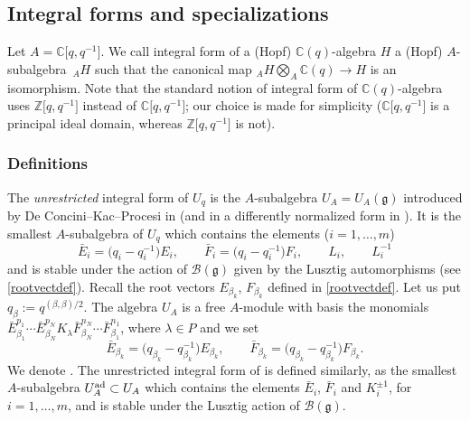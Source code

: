 \documentclass[10pt,a4paper]{amsart}
\numberwithin{equation}{section}
\theoremstyle{definition}
\newcommand{\mc}{\mathbb{C}}
\newcommand{\mz}{\mathbb{Z}}
\newcommand{\ra}{\rightarrow}
\begin{document}
\subsection{Integral forms and specializations}\label{INTEG} Let $A=\mc\big[q,q^{-1}\big]$. We call integral form of a (Hopf) $\mc(q)$-algebra $H$ a (Hopf) $A$-subalgebra~${}_AH$ such that the canonical map ${}_AH\bigotimes_A \mc(q) \ra H$ is an isomorphism. Note that the standard notion of integral form of $\mc(q)$-algebra uses $\mz\big[q,q^{-1}\big]$ instead of $\mc\big[q,q^{-1}\big]$; our choice is made for simplicity ($\mc\big[q,q^{-1}\big]$ is a principal ideal domain, whereas $\mz\big[q,q^{-1}\big]$ is not).

\subsubsection{Definitions}\label{defintform} The {\it unrestricted} integral form of $U_q$ is the $A$-subalgebra $U_A = U_A(\mathfrak{g})$ introduced by De Concini--Kac--Procesi in \cite[Section 12]{DC-K-P2} (and in a differently normalized form in \cite{DC-K,DC-K-P1}). It is the smallest $A$-subalgebra of $U_q$ which contains the elements ($i=1,\dots,m$)
\begin{equation}\label{normgen0}
\bar{E}_i = \big(q_i-q_i^{-1}\big)E_i,\qquad \bar{F}_i = \big(q_i-q_i^{-1}\big)F_i,\qquad L_i,\qquad L_i^{-1}
\end{equation}
and is stable under the action of $\mathcal{B}(\mathfrak{g})$ given by the Lusztig automorphisms (see \eqref{rootvectdef}). Recall the root vectors $E_{\beta_k}$, $F_{\beta_k}$ defined in \eqref{rootvectdef}. Let us put $q_\beta := q^{(\beta,\beta)/2}$. The algebra $U_A$ is a free $A$-module with basis the monomials $\bar{E}_{\beta_1}^{p_1}\cdots \bar{E}_{\beta_N}^{p_N}K_\lambda \bar{F}_{\beta_N}^{n_N}\cdots \bar{F}_{\beta_1}^{n_1}$, where $\lambda \in P$ and we set
\[\bar{E}_{\beta_k}= \big(q_{\beta_k}-q_{\beta_k}^{-1}\big)E_{\beta_k},\qquad \bar{F}_{\beta_k}= \big(q_{\beta_k}-q_{\beta_k}^{-1}\big)F_{\beta_k}.\]
We denote .
The unrestricted integral form of  is defined similarly, as the smallest $A$-subalgebra $U_A^{\rm ad} \subset U_A$ which contains the elements $\bar{E}_i$, $\bar{F}_i$ and $K_i^{\pm 1}$, for $i=1,\dots,m$, and is stable under the Lusztig action of $\mathcal{B}(\mathfrak{g})$.
\end{document}
